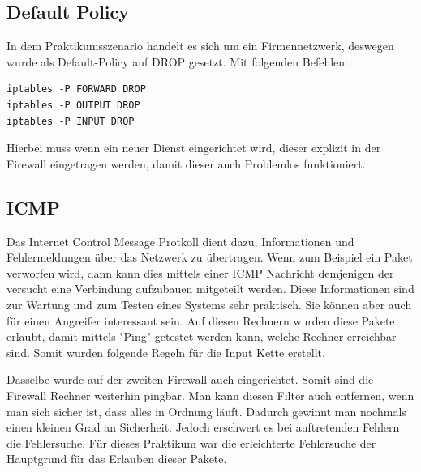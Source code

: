 \subsection{Default Policy}
In dem Praktikumsszenario handelt es sich um ein Firmennetzwerk, deswegen wurde als Default-Policy auf DROP gesetzt. Mit folgenden Befehlen:
\begin{lstlisting}[caption={Befehle für Default Policy}]
iptables -P FORWARD DROP
iptables -P OUTPUT DROP
iptables -P INPUT DROP
\end{lstlisting}
Hierbei muss wenn ein neuer Dienst eingerichtet wird, dieser explizit in der Firewall eingetragen werden, damit dieser auch Problemlos funktioniert.

\subsection{ICMP}
Das Internet Control Message Protkoll dient dazu, Informationen und Fehlermeldungen über das Netzwerk zu übertragen. Wenn zum Beispiel ein Paket verworfen wird, dann kann dies mittels einer ICMP Nachricht demjenigen der versucht eine Verbindung aufzubauen mitgeteilt werden. Diese Informationen sind zur Wartung und zum Testen eines Systems sehr praktisch. Sie können aber auch für einen Angreifer interessant sein. Auf diesen Rechnern wurden diese Pakete erlaubt, damit mittels "Ping" getestet werden kann, welche Rechner erreichbar sind. Somit wurden folgende Regeln für die Input Kette erstellt.

Dasselbe wurde auf der zweiten Firewall auch eingerichtet. Somit sind die Firewall Rechner weiterhin pingbar. Man kann diesen Filter auch entfernen, wenn man sich sicher ist, dass alles in Ordnung läuft. Dadurch gewinnt man nochmals einen kleinen Grad an Sicherheit. Jedoch erschwert es bei auftretenden Fehlern die Fehlersuche. Für dieses Praktikum war die erleichterte Fehlersuche der Hauptgrund für das Erlauben dieser Pakete.


